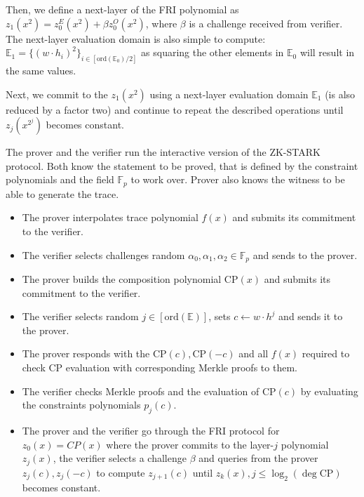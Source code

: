 \documentclass[../lecture-notes.tex]{subfiles}
\begin{document}
Then, we define a next-layer of the FRI polynomial as $z_1(x^2) = z_0^E(x^2) +
\beta z_0^O(x^2)$, where $\beta$ is a challenge received from verifier. The
next-layer evaluation domain is also simple to compute: $\mathbb{E}_1 =
\{(w\cdot h_i)^2\}_{i \in [\text{ord}(\mathbb{E}_0)/2]}$ as squaring the
other elements in $\mathbb{E}_0$ will result in the same values.

Next, we commit to the $z_1(x^2)$ using a next-layer evaluation domain
$\mathbb{E}_1$ (is also reduced by a factor two) and continue to repeat the
described operations until $z_j(x^{2^j})$ becomes constant.

\begin{tcolorbox}[title=Interactive ZK-STARK protocol,
    colback=blue!5!white,
    colframe=blue!75!black,
    colbacktitle=blue!25!white,
    coltitle=blue!20!black,
    fonttitle=\bfseries,
    boxrule=1.25pt,
    subtitle style={boxrule=0pt,
    colback=blue!20!white,
    colupper=blue!75!gray} ]
    \small

    The prover and the verifier run the interactive version of the ZK-STARK
    protocol. Both know the statement to be proved, that is defined by the
    constraint polynomials and the field $\mathbb{F}_p$ to work over. Prover also
    knows the witness to be able to generate the trace.

    \begin{itemize}[label=]
        \item The prover interpolates trace polynomial $f(x)$ and submits its
        commitment to the verifier.
        \item The verifier selects challenges random $\alpha_0, \alpha_1,
        \alpha_2 \in \mathbb{F}_p$ and sends to the prover.
        \item The prover builds the composition polynomial $\text{CP}(x)$ and
        submits its commitment to the verifier.
    \end{itemize}

    \begin{itemize}[label=]
        \item The verifier selects random $j \in [\text{ord}(\mathbb{E})]$, sets
        $c \gets w\cdot h^j$ and sends it to the prover.
        \item The prover responds with the $\text{CP}(c), \text{CP}(-c)$ and all
        $f(x)$ required to check $\text{CP}$ evaluation with corresponding Merkle
        proofs to them.
        \item The verifier checks Merkle proofs and the evaluation of
        $\text{CP}(c)$ by evaluating the constraints polynomials $p_j(c)$.
        \item The prover and the verifier go through the FRI protocol for
        $z_0(x) = CP(x)$ where the prover commits to the layer-$j$ polynomial
        $z_j(x)$, the verifier selects a challenge $\beta$ and queries from the
        prover $z_j(c), z_j(-c)$ to compute $z_{j+1}(c)$ until $z_k(x), j \leq
        \log_2(\deg \text{CP})$ becomes constant.
    \end{itemize}
    
\end{tcolorbox}
\end{document}
